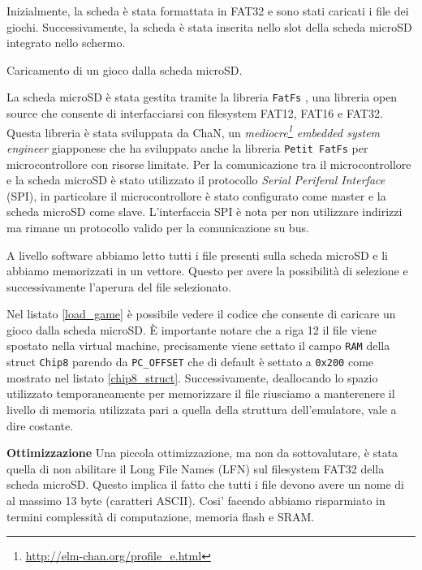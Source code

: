 \documentclass[a4paper]{article}
\begin{document}
Inizialmente, la scheda è stata formattata in FAT32 e sono stati caricati i file dei giochi. Successivamente, la scheda è stata inserita nello slot della scheda microSD integrato nello schermo.

\begin{Listing}[h!t] %
    \centering
    \caption{Caricamento di un gioco dalla scheda microSD.}
    \label{load_game}
\end{Listing}

La scheda microSD è stata gestita tramite la libreria \texttt{FatFs} \cite{elm-chan:fatfs}, una libreria open source che consente di interfacciarsi con filesystem FAT12, FAT16 e FAT32. Questa libreria è stata sviluppata da ChaN, un \textit{mediocre\footnote{\url{http://elm-chan.org/profile_e.html}} embedded system engineer} giapponese che ha sviluppato anche la libreria \texttt{Petit FatFs} per microcontrollore con risorse limitate.
Per la comunicazione tra il microcontrollore e la scheda microSD è stato utilizzato il protocollo \textit{Serial Periferal Interface} (SPI), in particolare il microcontrollore è stato configurato come master e la scheda microSD come slave. L'interfaccia SPI è nota per non utilizzare indirizzi ma rimane un protocollo valido per la comunicazione su bus.

A livello software abbiamo letto tutti i file presenti sulla scheda microSD e li abbiamo memorizzati in un vettore. Questo per avere la possibilità di selezione e successivamente l'aperura del file selezionato.

Nel listato \ref{load_game} è possibile vedere il codice che consente di caricare un gioco dalla scheda microSD. È importante notare che a riga 12 il file viene spostato nella virtual machine, precisamente viene settato il campo \texttt{RAM} della struct \texttt{Chip8} parendo da \texttt{PC\_OFFSET} che di default è settato a \texttt{0x200} come mostrato nel listato \ref{chip8_struct}. Successivamente, deallocando lo spazio utilizzato temporaneamente per memorizzare il file riusciamo a manterenere il livello di memoria utilizzata pari a quella della struttura dell'emulatore, vale a dire costante.

\textbf{Ottimizzazione} \quad  Una piccola ottimizzazione, ma non da sottovalutare, è stata quella di non abilitare il Long File Names (LFN) sul filesystem FAT32 della scheda microSD. Questo implica il fatto che tutti i file devono avere un nome di al massimo 13 byte (caratteri ASCII). Cosi' facendo abbiamo risparmiato in termini complessità di computazione, memoria flash e SRAM.
\end{document}
